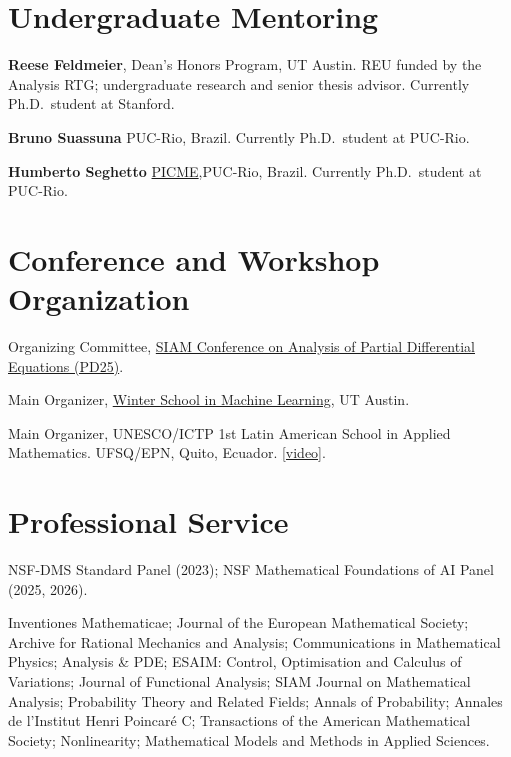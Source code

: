 \documentclass[11pt]{article}
\newcommand{\entry}[2]{%
  \par\addvspace{0.6ex}\noindent
  \begin{list}{}{%
    \setlength{\leftmargin}{1.5in}%
    \setlength{\labelwidth}{1.4in}%
    \setlength{\labelsep}{0.1in}%
  }%
  \item[\textsf{\small #1}] #2
  \end{list}
}
\begin{document}
\section{Undergraduate Mentoring}

\entry{2022--2024}{\textbf{Reese Feldmeier}, Dean's Honors Program, UT Austin. REU funded by the Analysis RTG; undergraduate research and senior thesis advisor. Currently Ph.D.\ 
student at Stanford.}
\entry{2019--2021}{\textbf{Bruno Suassuna} PUC-Rio, Brazil. Currently Ph.D.\ student at PUC-Rio.}
\entry{2019--2021}{\textbf{Humberto Seghetto} \href{https://picme.obmep.org.br/}{PICME},PUC-Rio, Brazil. Currently Ph.D.\ student at PUC-Rio.}

\section{Conference and Workshop Organization}

\entry{Fall 2025}{Organizing Committee, \href{https://www.siam.org/conferences-events/past-event-archive/pd25/}{SIAM Conference on Analysis of Partial Differential Equations (PD25)}.}

\entry{Spring 2024}{Main Organizer, \href{https://analysispde.ma.utexas.edu/winter-program-in-ml-2024/}{Winter School in Machine Learning}, UT Austin.}

\entry{2019}{Main Organizer, UNESCO/ICTP 1st Latin American School in Applied Mathematics. UFSQ/EPN, Quito, Ecuador. \href{https://www.youtube.com/watch?v=GpmSgL35Lcw}{[video]}.}


\section{Professional Service}

\entry{Grant Panels}{NSF-DMS Standard Panel (2023); NSF Mathematical Foundations of AI Panel (2025, 2026).}

\entry{Journals}{%
Inventiones Mathematicae;
Journal of the European Mathematical Society;
Archive for Rational Mechanics and Analysis;
Communications in Mathematical Physics;
Analysis \& PDE;
ESAIM: Control, Optimisation and Calculus of Variations;
Journal of Functional Analysis;
SIAM Journal on Mathematical Analysis;
Probability Theory and Related Fields;
Annals of Probability;
Annales de l'Institut Henri Poincar\'e C;
Transactions of the American Mathematical Society;
Nonlinearity;
Mathematical Models and Methods in Applied Sciences.
}
\end{document}
